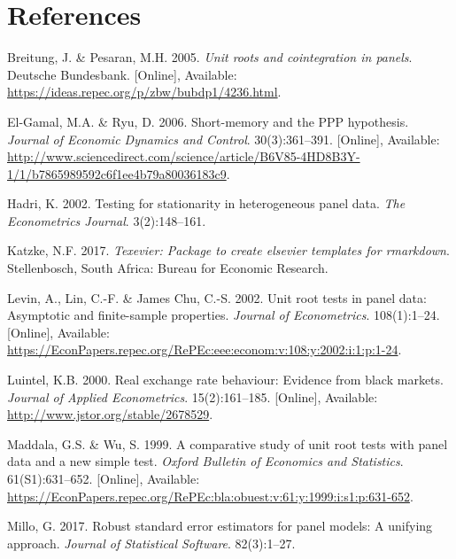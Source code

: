 \documentclass[11pt,preprint, authoryear]{elsarticle}
\numberwithin{equation}{section}
\numberwithin{figure}{section}
\numberwithin{table}{section}
\newlength{\cslhangindent}
\newenvironment{CSLReferences}%
  {\setlength{\parindent}{0pt}%
  \everypar{\setlength{\hangindent}{\cslhangindent}}\ignorespaces}%
  {\par}
\begin{document}
\newpage

\hypertarget{references}{%
\section*{References}\label{references}}

\hypertarget{refs}{}
\begin{CSLReferences}{1}{0}
\leavevmode\hypertarget{ref-pes}{}%
Breitung, J. \& Pesaran, M.H. 2005. \emph{Unit roots and cointegration
in panels}. Deutsche Bundesbank. {[}Online{]}, Available:
\url{https://ideas.repec.org/p/zbw/bubdp1/4236.html}.

\leavevmode\hypertarget{ref-puz}{}%
El-Gamal, M.A. \& Ryu, D. 2006. Short-memory and the PPP hypothesis.
\emph{Journal of Economic Dynamics and Control}. 30(3):361--391.
{[}Online{]}, Available:
\url{http://www.sciencedirect.com/science/article/B6V85-4HD8B3Y-1/1/b7865989592c6f1ee4b79a80036183c9}.

\leavevmode\hypertarget{ref-had}{}%
Hadri, K. 2002. Testing for stationarity in heterogeneous panel data.
\emph{The Econometrics Journal}. 3(2):148--161.

\leavevmode\hypertarget{ref-Texevier}{}%
Katzke, N.F. 2017. \emph{{Texevier}: {P}ackage to create elsevier
templates for rmarkdown}. Stellenbosch, South Africa: Bureau for
Economic Research.

\leavevmode\hypertarget{ref-lev}{}%
Levin, A., Lin, C.-F. \& James Chu, C.-S. 2002. Unit root tests in panel
data: Asymptotic and finite-sample properties. \emph{Journal of
Econometrics}. 108(1):1--24. {[}Online{]}, Available:
\url{https://EconPapers.repec.org/RePEc:eee:econom:v:108:y:2002:i:1:p:1-24}.

\leavevmode\hypertarget{ref-Kul}{}%
Luintel, K.B. 2000. Real exchange rate behaviour: Evidence from black
markets. \emph{Journal of Applied Econometrics}. 15(2):161--185.
{[}Online{]}, Available: \url{http://www.jstor.org/stable/2678529}.

\leavevmode\hypertarget{ref-wu}{}%
Maddala, G.S. \& Wu, S. 1999. A comparative study of unit root tests
with panel data and a new simple test. \emph{Oxford Bulletin of
Economics and Statistics}. 61(S1):631--652. {[}Online{]}, Available:
\url{https://EconPapers.repec.org/RePEc:bla:obuest:v:61:y:1999:i:s1:p:631-652}.

\leavevmode\hypertarget{ref-plm}{}%
Millo, G. 2017. Robust standard error estimators for panel models: A
unifying approach. \emph{Journal of Statistical Software}. 82(3):1--27.


\end{CSLReferences}
\end{document}
